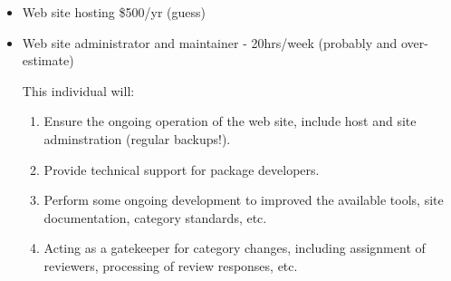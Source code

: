 \documentclass[12pt]{article}
\begin{document}
\begin{itemize}

\item Web site hosting \$500/yr	 (guess)

\item Web site administrator and maintainer - 20hrs/week (probably and
	over-estimate)

	This individual will:

	\begin{enumerate}

	\item Ensure the ongoing operation of the web site, include host and
		site adminstration (regular backups!).

	\item Provide technical support for package developers.

	\item Perform some ongoing development to improved the available
		tools, site documentation, category standards, etc.

	\item Acting as a gatekeeper for category changes, including
		assignment of reviewers, processing of review responses, etc.

	\end{enumerate}

\end{itemize}
\end{document}
